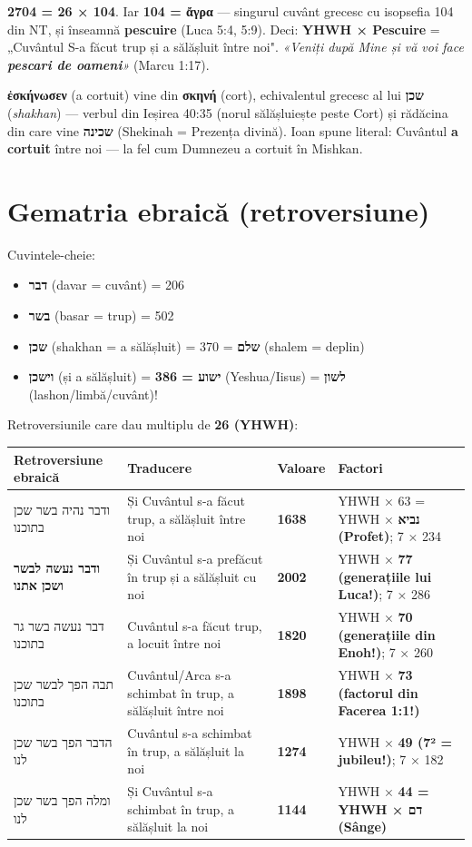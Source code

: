 \documentclass[12pt,a4paper,twoside,openany]{book}
\begin{document}
\bigskip

\textbf{2704 = 26 × 104}. Iar \textbf{104 = ἄγρα} — singurul cuvânt grecesc cu isopsefia 104 din NT, și înseamnă \textbf{pescuire} (Luca 5:4, 5:9). Deci: \textbf{YHWH × Pescuire} = „Cuvântul S-a făcut trup și a sălășluit între noi". \textit{«Veniți după Mine și vă voi face \textbf{pescari de oameni}»} (Marcu 1:17).

\textbf{ἐσκήνωσεν} (a cortuit) vine din \textbf{σκηνή} (cort), echivalentul grecesc al lui \textbf{שכן} (\textit{shakhan}) — verbul din Ieșirea 40:35 (norul sălășluiește peste Cort) și rădăcina din care vine \textbf{שכינה} (Shekinah = Prezența divină). Ioan spune literal: Cuvântul \textbf{a cortuit} între noi — la fel cum Dumnezeu a cortuit în Mishkan.

\section{Gematria ebraică (retroversiune)}

Cuvintele-cheie:
\begin{itemize}
\item \textbf{דבר} (davar = cuvânt) = 206
\item \textbf{בשר} (basar = trup) = 502
\item \textbf{שכן} (shakhan = a sălășluit) = 370 = \textbf{שלם} (shalem = deplin)
\item \textbf{וישכן} (și a sălășluit) = \textbf{386 = ישוע} (Yeshua/Iisus) = \textbf{לשון} (lashon/limbă/cuvânt)!
\end{itemize}

Retroversiunile care dau multiplu de \textbf{26 (YHWH)}:

\small
\begin{tabular}{|p{3.8cm}|p{3.5cm}|l|p{4.2cm}|}
\hline
\textbf{Retroversiune ebraică} & \textbf{Traducere} & \textbf{Valoare} & \textbf{Factori} \\
\hline
ודבר נהיה בשר שכן בתוכנו & Și Cuvântul s-a făcut trup, a sălășluit între noi & \textbf{1638} & YHWH × 63 = YHWH × \textbf{נביא (Profet)}; 7 × 234 \\
\hline
\textbf{ודבר נעשה לבשר ושכן אתנו} & Și Cuvântul s-a prefăcut în trup și a sălășluit cu noi & \textbf{2002} & YHWH × \textbf{77 (generațiile lui Luca!)}; 7 × 286 \\
\hline
דבר נעשה בשר גר בתוכנו & Cuvântul s-a făcut trup, a locuit între noi & \textbf{1820} & YHWH × \textbf{70 (generațiile din Enoh!)}; 7 × 260 \\
\hline
תבה הפך לבשר שכן בתוכנו & Cuvântul/Arca s-a schimbat în trup, a sălășluit între noi & \textbf{1898} & YHWH × \textbf{73 (factorul din Facerea 1:1!)} \\
\hline
הדבר הפך בשר שכן לנו & Cuvântul s-a schimbat în trup, a sălășluit la noi & \textbf{1274} & YHWH × \textbf{49 (7² = jubileu!)}; 7 × 182 \\
\hline
ומלה הפך בשר שכן לנו & Și Cuvântul s-a schimbat în trup, a sălășluit la noi & \textbf{1144} & YHWH × \textbf{44 = YHWH × דם (Sânge)} \\
\hline
\end{tabular}
\end{document}
